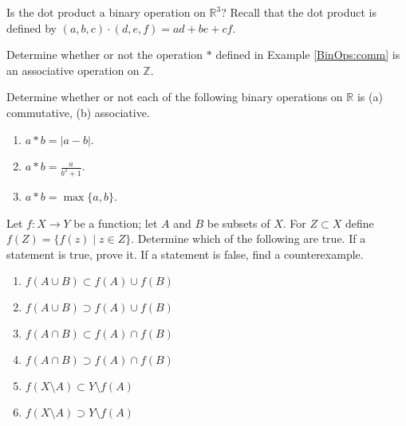 \begin{exercise}
Is the dot product a binary operation on $\mathbb R^3$?  Recall that the dot product is defined by $(a,b,c)\cdot(d,e,f)=ad+be+cf$.
\end{exercise}

\begin{exercise}
Determine whether or not the operation $*$ defined in Example \ref{BinOps:comm} is an associative operation on $\mathbb Z$.
\end{exercise}

\begin{exercise}\label{exer:binop}
Determine whether or not each of the following binary operations on $\mathbb R$ is (a) commutative, (b) associative.
\begin{enumerate}
\item\label{binop:distance}\markit $a*b=|a-b|$.
\item $a*b=\frac{a}{b^2+1}$.
\item $a*b=\max\{a,b\}$.
\end{enumerate}
\end{exercise}

\begin{exercise}\label{exer:images}
Let $f:X\to Y$ be a function; let $A$ and $B$ be subsets of $X$. For $Z\subset X$ define $f(Z)=\{ f(z)\mid z\in Z\}$. Determine which of the following are true.  If a statement is true, prove it.  If a statement is false, find a counterexample.
\begin{enumerate}
\item\label{images:union}\markit $f(A\cup B)\subset f(A)\cup f(B)$
\item $f(A\cup B)\supset f(A)\cup f(B)$
\item $f(A\cap B)\subset f(A)\cap f(B)$
\item $f(A\cap B)\supset f(A)\cap f(B)$
\item\label{images:complement}\markit $f(X\setminus A)\subset Y\setminus f(A)$
\item $f(X\setminus A)\supset Y\setminus f(A)$
\end{enumerate}
\end{exercise}

